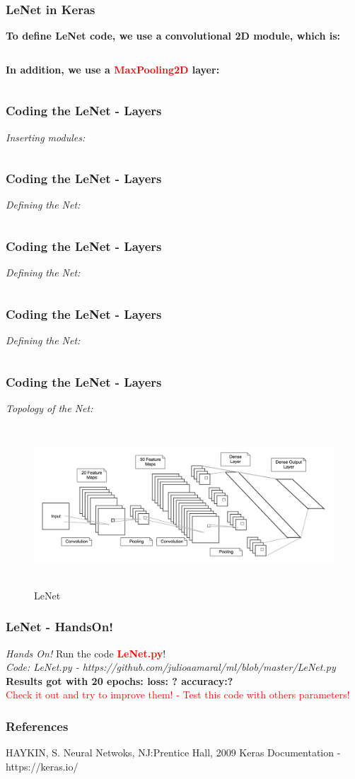 \documentclass[aspectratio=169]{beamer}
\begin{document}
\begin{frame}
\frametitle{LeNet in Keras}
\textbf{To define LeNet code, we use a convolutional 2D module, which is:}
\inputminted{python}{twentyeight.py}
\textbf{In addition, we use a \textcolor{red}{MaxPooling2D} layer:}
\inputminted{python}{twentynine.py}
\end{frame}

\begin{frame}
\frametitle{Coding the LeNet - Layers}
\emph{Inserting  modules:}
\inputminted{python}{thirty.py}
\end{frame}

\begin{frame}
\frametitle{Coding the LeNet - Layers}
\emph{Defining the Net:}
\inputminted{python}{thirtyone.py}
\end{frame}

\begin{frame}
\frametitle{Coding the LeNet - Layers}
\emph{Defining the Net:}
\inputminted{python}{thirtytwo.py}
\end{frame}

\begin{frame}
\frametitle{Coding the LeNet - Layers}
\emph{Defining the Net:}
\inputminted{python}{thirtythree.py}
\end{frame}

\begin{frame}
\frametitle{Coding the LeNet - Layers}
\emph{Topology of the Net:}
\begin{figure}
\includegraphics[width=12cm,height=6cm]{four.jpg}
\caption{LeNet}
\label{fig:LeNet Topology}
\end{figure}
\end{frame}

\begin{frame}
\frametitle{LeNet - HandsOn!}
\emph{Hands On!}
Run the code \textcolor{red}{\textbf{LeNet.py}}! 
\\[0.5cm]
\emph{Code: LeNet.py - https://github.com/julioaamaral/ml/blob/master/LeNet.py}
\\[0.3cm]
\textbf{Results got with 20 epochs: loss: ? accuracy:?}
\\[0.3cm]
\textcolor{red}{Check it out and try to improve them! - Test this code with others parameters!}
\end{frame}

\begin{frame}
\frametitle{References}
\footnotesize{
\begin{thebibliography}{99} 
 HAYKIN, S. Neural Netwoks, NJ:Prentice Hall, 2009
 Keras Documentation - https://keras.io/
\end{thebibliography}
}
\end{frame}
\end{document}
